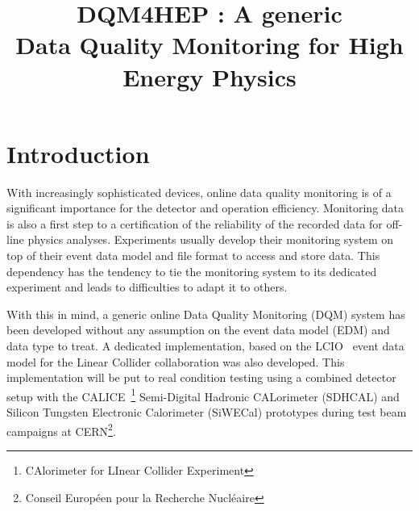 \documentclass[conference]{IEEEtran}
\begin{document}
\title{DQM4HEP : A generic\\Data Quality Monitoring for High Energy Physics}

\author{


\and


\and


}

\maketitle

\IEEEpeerreviewmaketitle

\section{Introduction}

With increasingly sophisticated devices, online data quality monitoring is of a significant importance for the detector and operation efficiency. Monitoring data is also a first step to a certification of the reliability of the recorded data for off-line physics analyses. Experiments usually develop their monitoring system on top of their event data model and file format to access and store data. This dependency has the tendency to tie the monitoring system to its dedicated experiment and leads to difficulties to adapt it to others.

With this in mind, a generic online Data Quality Monitoring (DQM) system has been developed without any assumption on the event data model (EDM) and data type to treat. A dedicated implementation, based on the LCIO~\cite{LCIO} event data model for the Linear Collider collaboration was also developed. This implementation will be put to real condition testing using a combined detector setup with the CALICE~\footnote{CAlorimeter for LInear Collider Experiment} Semi-Digital Hadronic CALorimeter (SDHCAL) and Silicon Tungsten Electronic Calorimeter (SiWECal) prototypes during test beam campaigns at CERN\footnote{Conseil Européen pour la Recherche Nucléaire}.
\end{document}
